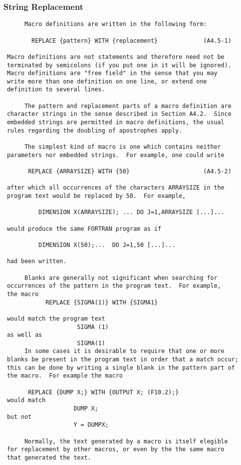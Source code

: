  \subsubsection{String Replacement}
 \begin{verbatim}
      Macro definitions are written in the following form:
 
        REPLACE {pattern} WITH {replacement}             (A4.5-1)
 
 Macro definitions are not statements and therefore need not be
 terminated by semicolons (if you put one in it will be ignored).
 Macro definitions are "free field" in the sense that you may
 write more than one definition on one line, or extend one
 definition to several lines.
 
      The pattern and replacement parts of a macro definition are
 character strings in the sense described in Section A4.2.  Since
 embedded strings are permitted in macro definitions, the usual
 rules regarding the doubling of apostrophes apply.
 
      The simplest kind of macro is one which contains neither
 parameters nor embedded strings.  For example, one could write
 
       REPLACE {ARRAYSIZE} WITH {50}                     (A4.5-2)
 
 after which all occurrences of the characters ARRAYSIZE in the
 program text would be replaced by 50.  For example,
 
          DIMENSION X(ARRAYSIZE); ... DO J=1,ARRAYSIZE [...]...
 
 would produce the same FORTRAN program as if
 
          DIMENSION X(50);...  DO J=1,50 [...]...
 
 had been written.
 
      Blanks are generally not significant when searching for
 occurrences of the pattern in the program text.  For example,
 the macro
            REPLACE {SIGMA(1)} WITH {SIGMA1}
 
 would match the program text
                     SIGMA (1)
 as well as
                     SIGMA(1)
      In some cases it is desirable to require that one or more
 blanks be present in the program text in order that a match occur;
 this can be done by writing a single blank in the pattern part of
 the macro.  For example the macro
 
       REPLACE {DUMP X;} WITH {OUTPUT X; (F10.2);}
 would match
                    DUMP X;
 but not
                    Y = DUMPX;
 
      Normally, the text generated by a macro is itself elegible
 for replacement by other macros, or even by the the same macro
 that generated the text.
 
 \end{verbatim}
